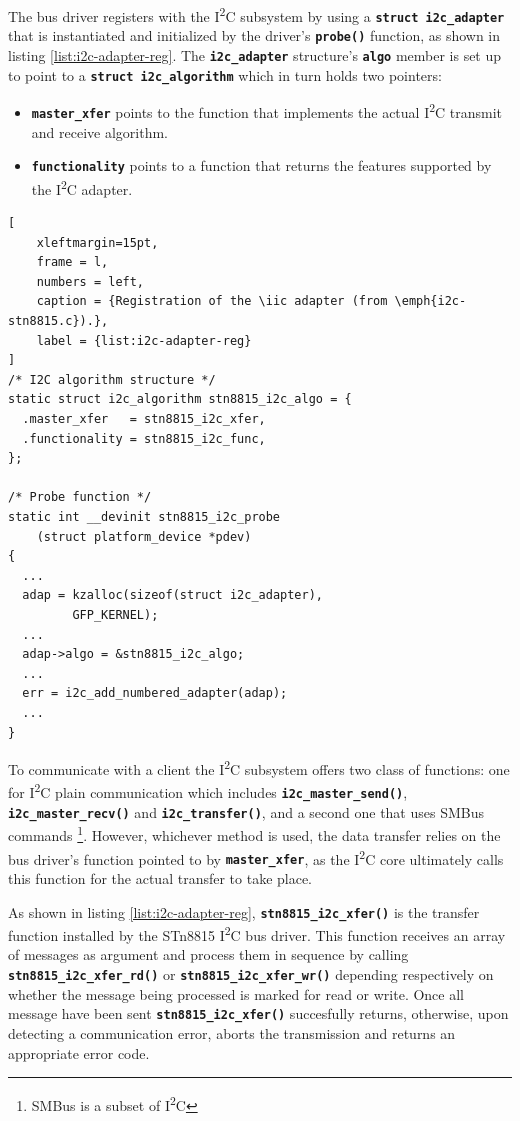 \documentclass[a4paper,10pt]{article}
\newenvironment{packeditems}{
\begin{itemize}
  \setlength{\itemsep}{3pt}
  \setlength{\parskip}{0pt}
  \setlength{\parsep}{0pt}
}{\end{itemize}}
\newcommand{\iic}{I\textsuperscript{2}C }
\newcommand{\keyword}[1]{\texttt{\textbf{#1}}}
\begin{document}
\begin{multicols}{2}
The bus driver registers with the \iic subsystem by using a
\keyword{struct i2c\_adapter} that is instantiated and initialized by the
driver's \keyword{probe()} function, as shown in listing
\ref{list:i2c-adapter-reg}.
The \keyword{i2c\_adapter} structure's \keyword{algo} member is set up to
point to a \keyword{struct i2c\_algorithm} which in turn holds two pointers:
\begin{packeditems}
	\item \keyword{master\_xfer} points to the function that implements the
		actual \iic transmit and receive algorithm.
	\item \keyword{functionality} points to a function that returns the
		features supported by the \iic adapter.
\end{packeditems}

\begin{lstlisting}[
	xleftmargin=15pt,
	frame = l,
	numbers = left,
	caption = {Registration of the \iic adapter (from \emph{i2c-stn8815.c}).},
	label = {list:i2c-adapter-reg}
]
/* I2C algorithm structure */
static struct i2c_algorithm stn8815_i2c_algo = {
  .master_xfer   = stn8815_i2c_xfer,
  .functionality = stn8815_i2c_func,
};

/* Probe function */
static int __devinit stn8815_i2c_probe
	(struct platform_device *pdev)
{
  ...
  adap = kzalloc(sizeof(struct i2c_adapter),
         GFP_KERNEL);
  ...
  adap->algo = &stn8815_i2c_algo;
  ...
  err = i2c_add_numbered_adapter(adap);
  ...
}
\end{lstlisting}

To communicate with a client the \iic subsystem offers two class of functions:
one for \iic plain communication which includes \keyword{i2c\_master\_send()},
\keyword{i2c\_master\_recv()} and \keyword{i2c\_transfer()}, and a second one
that uses SMBus commands
\footnote{SMBus is a subset of \iic}.
However, whichever method is used, the data transfer relies on the bus driver's
function pointed to by \keyword{master\_xfer}, as the \iic core ultimately calls
this function for the actual transfer to take place.

As shown in listing \ref{list:i2c-adapter-reg}, \keyword{stn8815\_i2c\_xfer()}
is the transfer function installed by the STn8815 \iic bus driver.
This function receives an array of messages as argument and process
them in sequence by calling \keyword{stn8815\_i2c\_xfer\_rd()} or
\keyword{stn8815\_i2c\_xfer\_wr()} depending respectively on whether the message
being processed is marked for read or write.
Once all message have been sent \keyword{stn8815\_i2c\_xfer()} succesfully
returns, otherwise, upon detecting a communication error, aborts the transmission
and returns an appropriate error code.


\end{multicols}
\end{document}
